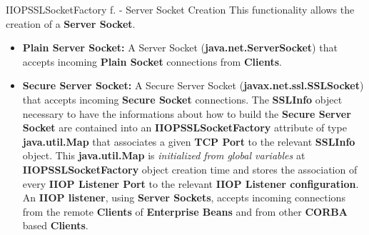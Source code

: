 \documentclass{../common/latex_classes/pdf_presentation}
\begin{document}
		\begin{frame}{IIOPSSLSocketFactory f. - Server Socket Creation}
			This functionality allows the creation of a \textbf{Server Socket}.
			\begin{itemize}
				\item \textbf{Plain Server Socket:}
				A Server Socket (\textbf{java.net.ServerSocket}) that accepts incoming \textbf{Plain Socket} connections from \textbf{Clients}.
				\item \textbf{Secure Server Socket:}
				A Secure Server Socket (\textbf{javax.net.ssl.SSLSocket}) that accepts incoming \textbf{Secure Socket} connections.
				The \textbf{SSLInfo} object necessary to have the informations about how to build the \textbf{Secure Server Socket} are contained into an \textbf{IIOPSSLSocketFactory} attribute of type \textbf{java.util.Map} that associates a given \textbf{TCP Port} to the relevant \textbf{SSLInfo} object.
				This \textbf{java.util.Map} is \textit{initialized from global variables}
				at \textbf{IIOPSSLSocketFactory} object creation time and stores the association of every \textbf{IIOP Listener Port} to the relevant \textbf{IIOP Listener configuration}.
				An \textbf{IIOP listener}, using \textbf{Server Sockets}, accepts incoming connections from the remote \textbf{Clients} of \textbf{Enterprise Beans} and from other \textbf{CORBA}
				based \textbf{Clients}.
			\end{itemize}
		\end{frame}
		
\end{document}
